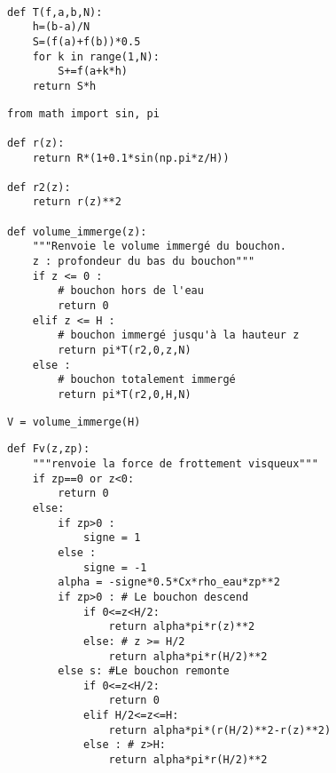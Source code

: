 \exer{[EQD-003]}
\setcounter{numques}{0}~\\

\question{} 
\begin{lstlisting}
def T(f,a,b,N):
    h=(b-a)/N
    S=(f(a)+f(b))*0.5
    for k in range(1,N):
        S+=f(a+k*h)
    return S*h
\end{lstlisting}

\question{} 

\begin{lstlisting}
from math import sin, pi

def r(z):
    return R*(1+0.1*sin(np.pi*z/H))
    
def r2(z):
    return r(z)**2

def volume_immerge(z):
    """Renvoie le volume immergé du bouchon.
    z : profondeur du bas du bouchon"""
    if z <= 0 :
        # bouchon hors de l'eau
        return 0
    elif z <= H :
        # bouchon immergé jusqu'à la hauteur z
        return pi*T(r2,0,z,N)
    else :
        # bouchon totalement immergé
        return pi*T(r2,0,H,N)
\end{lstlisting}

\question{} 
\begin{lstlisting}
V = volume_immerge(H)
\end{lstlisting}


\question{} 
\begin{lstlisting}
def Fv(z,zp):
    """renvoie la force de frottement visqueux"""
    if zp==0 or z<0:
        return 0
    else:
        if zp>0 : 
            signe = 1
        else :
            signe = -1
        alpha = -signe*0.5*Cx*rho_eau*zp**2
        if zp>0 : # Le bouchon descend
            if 0<=z<H/2:
                return alpha*pi*r(z)**2
            else: # z >= H/2
                return alpha*pi*r(H/2)**2
        else s: #Le bouchon remonte
            if 0<=z<H/2:
                return 0
            elif H/2<=z<=H:
                return alpha*pi*(r(H/2)**2-r(z)**2)
            else : # z>H:
                return alpha*pi*r(H/2)**2
\end{lstlisting}


